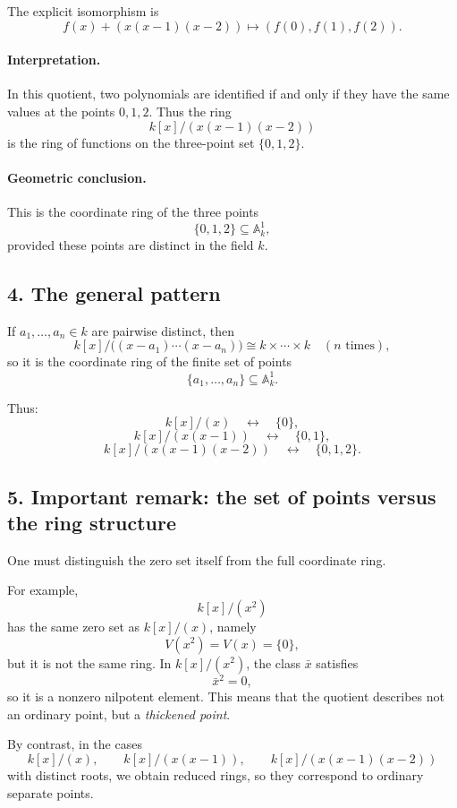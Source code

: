 \documentclass[12pt,a4paper]{article}
\theoremstyle{notespace}
\begin{document}
The explicit isomorphism is
\[
f(x)+(x(x-1)(x-2))
\longmapsto
(f(0),f(1),f(2)).
\]

\paragraph{Interpretation.}
In this quotient, two polynomials are identified if and only if they have the same values at the points \(0,1,2\). Thus the ring
\[
k[x]/(x(x-1)(x-2))
\]
is the ring of functions on the three-point set \(\{0,1,2\}\).

\paragraph{Geometric conclusion.}
This is the coordinate ring of the three points
\[
\{0,1,2\}\subseteq \mathbb A_k^1,
\]
provided these points are distinct in the field \(k\).

\subsection*{4. The general pattern}

If \(a_1,\dots,a_n\in k\) are pairwise distinct, then
\[
k[x]/\bigl((x-a_1)\cdots(x-a_n)\bigr)
\cong
k\times\cdots\times k
\quad (n\text{ times}),
\]
so it is the coordinate ring of the finite set of points
\[
\{a_1,\dots,a_n\}\subseteq \mathbb A_k^1.
\]

Thus:
\[
k[x]/(x)
\quad\leftrightarrow\quad
\{0\},
\]
\[
k[x]/(x(x-1))
\quad\leftrightarrow\quad
\{0,1\},
\]
\[
k[x]/(x(x-1)(x-2))
\quad\leftrightarrow\quad
\{0,1,2\}.
\]

\subsection*{5. Important remark: the set of points versus the ring structure}

One must distinguish the zero set itself from the full coordinate ring.

For example,
\[
k[x]/(x^2)
\]
has the same zero set as \(k[x]/(x)\), namely
\[
V(x^2)=V(x)=\{0\},
\]
but it is not the same ring. In \(k[x]/(x^2)\), the class \(\bar x\) satisfies
\[
\bar x^2=0,
\]
so it is a nonzero nilpotent element. This means that the quotient describes not an ordinary point, but a \emph{thickened point}.

By contrast, in the cases
\[
k[x]/(x),\qquad k[x]/(x(x-1)),\qquad k[x]/(x(x-1)(x-2))
\]
with distinct roots, we obtain reduced rings, so they correspond to ordinary separate points.
\end{document}

